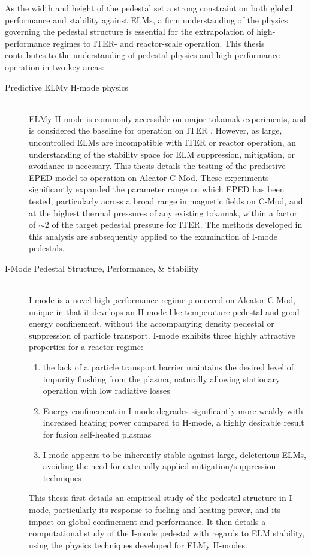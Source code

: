 \documentclass[ twoside,openright,titlepage,numbers=noenddot,headinclude,%
                footinclude=true,cleardoublepage=empty,abstractoff, %
                BCOR=5mm,paper=letter,fontsize=11pt,%
                ngerman,american,%
                ]{scrreprt}
\begin{document}
As the width and height of the pedestal set a strong constraint on both global performance and stability against ELMs, a firm understanding of the physics governing the pedestal structure is essential for the extrapolation of high-performance regimes to ITER- and reactor-scale operation.  This thesis contributes to the understanding of pedestal physics and high-performance operation in two key areas:

\begin{description}
 \item[Predictive ELMy H-mode physics] \hfill \\
 ELMy H-mode is commonly accessible on major tokamak experiments, and is considered the baseline for operation on ITER \cite{Shimada2007}.  However, as large, uncontrolled ELMs are incompatible with ITER or reactor operation, an understanding of the stability space for ELM suppression, mitigation, or avoidance is necessary.  This thesis details the testing of the predictive EPED model to operation on Alcator C-Mod.  These experiments significantly expanded the parameter range on which EPED has been tested, particularly across a broad range in magnetic fields on C-Mod, and at the highest thermal pressures of any existing tokamak, within a factor of $\sim 2$ of the target pedestal pressure for ITER.  The methods developed in this analysis are subsequently applied to the examination of I-mode pedestals.
 \item[I-Mode Pedestal Structure, Performance, \& Stability] \hfill \\
 I-mode \cite{Whyte2010} is a novel high-performance regime pioneered on Alcator C-Mod, unique in that it develops an H-mode-like temperature pedestal and good energy confinement, without the accompanying density pedestal or suppression of particle transport.  I-mode exhibits three highly attractive properties for a reactor regime:
 
 \begin{enumerate}
  \item the lack of a particle transport barrier maintains the desired level of impurity flushing from the plasma, naturally allowing stationary operation with low radiative losses
  \item Energy confinement in I-mode degrades significantly more weakly with increased heating power compared to H-mode, a highly desirable result for fusion self-heated plasmas
  \item I-mode appears to be inherently stable against large, deleterious ELMs, avoiding the need for externally-applied mitigation/suppression techniques
 \end{enumerate}
 
This thesis first details an empirical study of the pedestal structure in I-mode, particularly its response to fueling and heating power, and its impact on global confinement and performance.  It then details a computational study of the I-mode pedestal with regards to ELM stability, using the physics techniques developed for ELMy H-modes.
\end{description}
\end{document}
